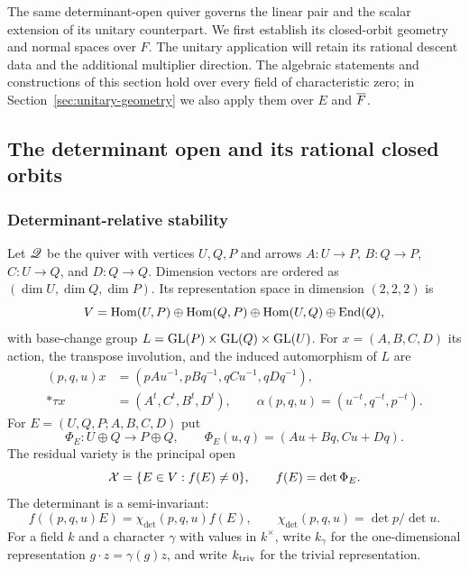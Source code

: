 The same determinant-open quiver governs the linear pair
and the scalar extension of its unitary counterpart. We first establish
its closed-orbit geometry and normal spaces over $F$. The
unitary application will retain its rational descent data and the
additional multiplier direction.
The algebraic statements and constructions of this section hold over
every field of characteristic zero; in Section~\ref{sec:unitary-geometry}
we also apply them over $E$ and $\overline F$.

\subsection{The determinant open and its rational closed orbits}\label{m1:sec:geometry}
\subsubsection{Determinant-relative stability}\label{m1:subsec:determinant-stability}
Let $\mathscr Q$ be the quiver with vertices $U,Q,P$ and arrows
$A:U\to P$, $B:Q\to P$, $C:U\to Q$, and $D:Q\to Q$. Dimension vectors
are ordered as $(\dim U,\dim Q,\dim P)$. Its representation space in
dimension $(2,2,2)$ is
\[
 V=\operatorname{Hom}(U,P)\oplus\operatorname{Hom}(Q,P)\oplus\operatorname{Hom}(U,Q)\oplus\operatorname{End}(Q),
\]
with base-change group $L=\operatorname{GL}(P)\times\operatorname{GL}(Q)\times\operatorname{GL}(U)$.
For $x=(A,B,C,D)$ its action, the transpose involution, and the
induced automorphism of $L$ are
\begin{align}
 (p,q,u)x&=(pAu^{-1},pBq^{-1},qCu^{-1},qDq^{-1}),
 \label{m1:eq:residual-action}\\*
 \tau x&=(A^t,C^t,B^t,D^t),\qquad
 \alpha(p,q,u)=(u^{-t},q^{-t},p^{-t}).\label{m1:eq:tau}
\end{align}
 For $E=(U,Q,P;A,B,C,D)$ put
\begin{equation}\label{m1:eq:block-map}
 \Phi_E:U\oplus Q\longrightarrow P\oplus Q,
 \qquad\Phi_E(u,q)=(Au+Bq,Cu+Dq).
\end{equation}
The residual variety is the principal open
\begin{equation}\label{m1:eq:X}
 \mathcal X=\{E\in V:f(E)\neq0\},\qquad f(E)=\det\Phi_E.
\end{equation}
The determinant is a semi-invariant:
\begin{equation}\label{m1:eq:det-character}
 f((p,q,u)E)=\chi_{\det}(p,q,u)f(E),
 \qquad\chi_{\det}(p,q,u)=\det p/\det u.
\end{equation}
For a field $k$ and a character $\gamma$ with values in $k^\times$,
write $k_\gamma$ for the one-dimensional representation $g\cdot z=\gamma(g)z$,
and write $k_{\mathrm{triv}}$ for the trivial representation.

